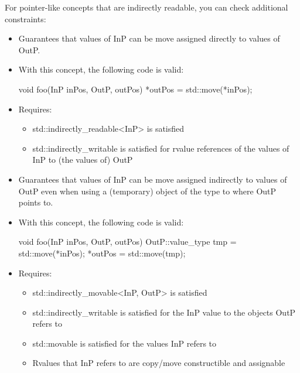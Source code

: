 For pointer-like concepts that are indirectly readable, you can check additional constraints:


\begin{itemize}
\item
Guarantees that values of InP can be move assigned directly to values of OutP.

\item
With this concept, the following code is valid:

\begin{cpp}
void foo(InP inPos, OutP, outPos) {
	*outPos = std::move(*inPos);
}
\end{cpp}

\item
Requires:
\begin{itemize}
\item
std::indirectly\_readable<InP> is satisfied

\item
std::indirectly\_writable is satisfied for rvalue references of the values of InP to (the values of) OutP
\end{itemize}
\end{itemize}


\begin{itemize}
\item
Guarantees that values of InP can be move assigned indirectly to values of OutP even when using a (temporary) object of the type to where OutP points to.

\item
With this concept, the following code is valid:

\begin{cpp}
void foo(InP inPos, OutP, outPos) {
	OutP::value_type tmp = std::move(*inPos);
	*outPos = std::move(tmp);
}
\end{cpp}

\item
Requires:
\begin{itemize}
\item
std::indirectly\_movable<InP, OutP> is satisfied

\item
std::indirectly\_writable is satisfied for the InP value to the objects OutP refers to

\item
std::movable is satisfied for the values InP refers to

\item
Rvalues that InP refers to are copy/move constructible and assignable
\end{itemize}
\end{itemize}

